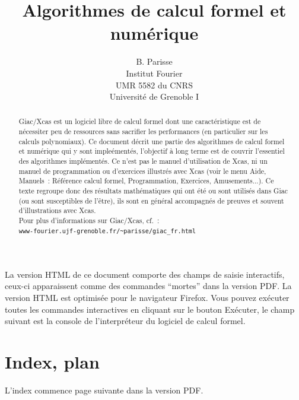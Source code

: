 \documentclass[a4paper,11pt]{article}
\title {Algorithmes de calcul formel et num\'erique}
\author{B. Parisse\\Institut Fourier\\UMR 5582 du CNRS
\\Université de Grenoble I}
\date{}
\begin{document}
\begin{giacjshere} %

\maketitle

La version HTML de ce document comporte des champs de saisie
interactifs, ceux-ci apparaissent comme des commandes ``mortes'' dans
la version PDF. La version HTML est
optimis\'ee pour le navigateur Firefox. Vous pouvez
ex\'ecuter toutes les commandes interactives en cliquant sur le bouton
Ex\'ecuter, le champ suivant est la console de l'interpr\'eteur du
logiciel de calcul formel.

\begin{abstract}
Giac/Xcas est un logiciel libre de calcul formel dont
une caract\'eristique est de n\'ecessiter peu de ressources sans
sacrifier les performances (en particulier sur les calculs polynomiaux).
 Ce document d\'ecrit une partie des algorithmes de calcul formel et
 num\'erique qui y sont
imple\'ement\'es, l'objectif \`a long terme
est de couvrir l'essentiel des algorithmes impl\'ement\'es.
Ce n'est pas le manuel d'utilisation de Xcas, ni un manuel de programmation
ou d'exercices illustr\'es avec Xcas (voir le menu Aide, Manuels~:
R\'ef\'erence calcul formel, Programmation, Exercices, Amusements...).
Ce texte regroupe donc des r\'esultats
math\'ematiques qui ont \'et\'e ou sont utilis\'es dans Giac
(ou sont susceptibles de l'\^etre),
ils sont en g\'en\'eral accompagn\'es de preuves 
et souvent d'illustrations avec Xcas.\\
Pour plus d'informations sur Giac/Xcas, cf.~:\\
\verb|www-fourier.ujf-grenoble.fr/~parisse/giac_fr.html|
\end{abstract}

\tableofcontents 


\section{Index, plan} \label{sec:index}
L'index commence page suivante dans la version PDF.


\end{giacjshere}
\end{document}
